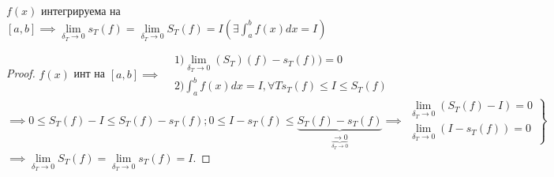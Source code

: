 \documentclass[../main.tex]{subfiles}
\begin{document}
\begin{corollary}
    $f(x)$ интегрируема на $[a,b]\implies \lim\limits_{\delta_{T}\to 0}s_{T}(f)=\lim\limits_{\delta_{T}\to 0}S_{T}(f)=I (\exists \displaystyle \int _{a}^{b}f(x)dx=I)$
\end{corollary}
\vspace{0.2cm}
\begin{proof}
    $f(x)$ инт на $[a,b]$$\implies \begin{aligned}
        &1) \lim\limits_{\delta_{T}\to 0}(S_{T})(f)-s_{T}(f))=0 \\ 
        &2) \int _{a}^{b}f(x)dx=I, \forall T s_{T}(f)\leqslant I\leqslant S_{T}(f) 
    \end{aligned}$$\implies 0\leqslant S_{T}(f)-I\leqslant S_{T}(f)-s_{T}(f); 0\leqslant I-s_{T}(f)\leqslant \underbrace{S_{T}(f)-s_{T}(f)}_{\underbrace{\to 0}_{\delta_{T} \to 0}}
    \implies\left. \begin{aligned}
        \lim\limits_{\delta_{T}\to 0}(S_{T}(f)-I)=0 \\ 
        \lim\limits_{\delta_{T}\to 0}(I-s_{T}(f))=0 
    \end{aligned}\right\} $$\implies \lim\limits_{\delta_{T}\to 0}S_{T}(f)=\lim\limits_{\delta_{T}\to 0}s_{T}(f)=I$.
\end{proof}
\end{document}
